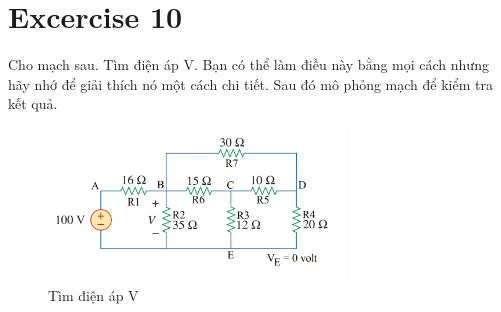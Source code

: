 \section{Excercise 10}
Cho mạch sau. Tìm điện áp V. Bạn có thể làm điều này bằng mọi cách nhưng hãy nhớ
để giải thích nó một cách chi tiết. Sau đó mô phỏng mạch để kiểm tra kết quả.\\
\begin{figure}[!htbp]
    \centering
    \includegraphics[width=0.7\textwidth]{graphics/ex10/f1.png}
    \caption{Tìm điện áp V}
\end{figure}